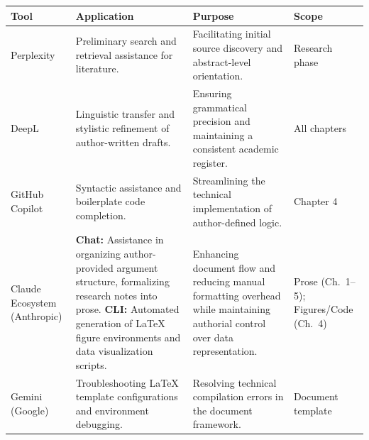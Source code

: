 \documentclass{imc-inf}
\begin{document}
\vspace{0.4cm}
\small
\noindent
 \begin{tabular}{|p{}|p{}|p{}|p{}|}
 \hline
 \textbf{Tool} & \textbf{Application} & \textbf{Purpose} & \textbf{Scope} \\ \hline
 Perplexity & Preliminary search and retrieval assistance for literature. & Facilitating initial source discovery and abstract-level orientation. & Research phase \\ \hline
 DeepL & Linguistic transfer and stylistic refinement of author-written drafts. & Ensuring grammatical precision and maintaining a consistent academic register. & All chapters \\ \hline
 GitHub Copilot & Syntactic assistance and boilerplate code completion. & Streamlining the technical implementation of author-defined logic. & Chapter 4 \\ \hline
 Claude Ecosystem (Anthropic) & \textbf{Chat:} Assistance in organizing author-provided argument structure, formalizing research notes into prose. \newline \textbf{CLI:} Automated generation of \LaTeX{} figure environments and data visualization scripts. & Enhancing document flow and reducing manual formatting overhead while maintaining authorial control over data representation. & Prose (Ch.~1--5); Figures/Code (Ch.~4) \\ \hline
 Gemini (Google) & Troubleshooting \LaTeX{} template configurations and environment debugging. & Resolving technical compilation errors in the document framework. & Document template \\ \hline
 \end{tabular}
 \newpage

%
\tableofcontents%
\clearpage

%
\listoftables
\clearpage

%
\listoffigures
\clearpage

\mainmatter







\appendix



\backmatter%



\end{document}
